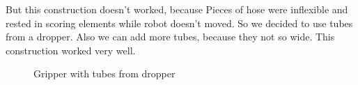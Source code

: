 But this construction doesn't worked, because Pieces of hose were inflexible and rested in scoring elements while robot doesn't moved. So we decided to use tubes from a dropper. Also we can add more tubes, because they not so wide. This construction worked very well.
   \begin{figure}[H]
		\begin{minipage}[h]{\linewidth}
			\caption{Gripper with tubes from dropper}
		\end{minipage}
	\end{figure}
	
\fillpage	
